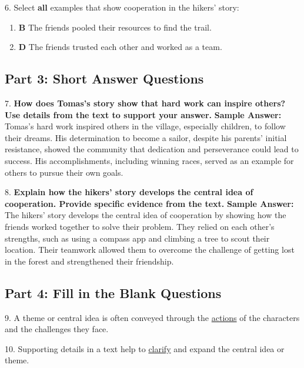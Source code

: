 \documentclass[12pt]{article}
\begin{document}
6. Select \textbf{all} examples that show cooperation in the hikers’ story:
\begin{enumerate}[label=\Alph*.]
    \item \textbf{B} The friends pooled their resources to find the trail.
    \item \textbf{D} The friends trusted each other and worked as a team.
\end{enumerate}

\subsection*{Part 3: Short Answer Questions}

7. \textbf{How does Tomas’s story show that hard work can inspire others? Use details from the text to support your answer.}
\textbf{Sample Answer:} Tomas’s hard work inspired others in the village, especially children, to follow their dreams. His determination to become a sailor, despite his parents’ initial resistance, showed the community that dedication and perseverance could lead to success. His accomplishments, including winning races, served as an example for others to pursue their own goals.

8. \textbf{Explain how the hikers’ story develops the central idea of cooperation. Provide specific evidence from the text.}
\textbf{Sample Answer:} The hikers’ story develops the central idea of cooperation by showing how the friends worked together to solve their problem. They relied on each other’s strengths, such as using a compass app and climbing a tree to scout their location. Their teamwork allowed them to overcome the challenge of getting lost in the forest and strengthened their friendship.

\subsection*{Part 4: Fill in the Blank Questions}

9. A theme or central idea is often conveyed through the \underline{actions} of the characters and the challenges they face.

10. Supporting details in a text help to \underline{clarify} and expand the central idea or theme.
\end{document}
